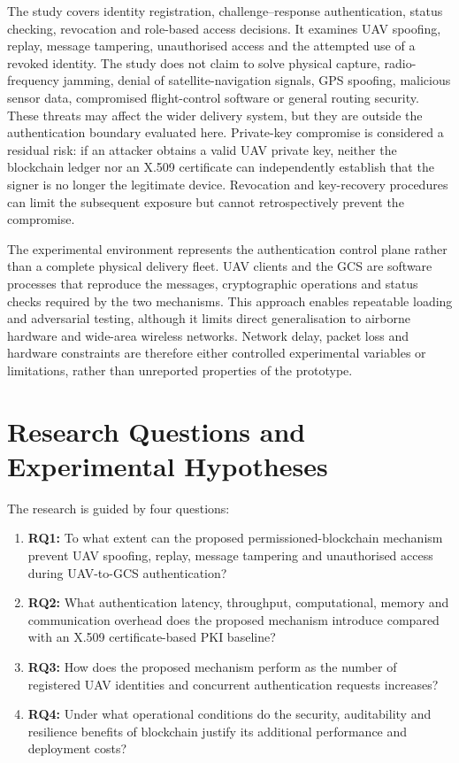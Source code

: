 The study covers identity registration, challenge--response authentication, status checking, revocation and role-based access decisions. It examines UAV spoofing, replay, message tampering, unauthorised access and the attempted use of a revoked identity. The study does not claim to solve physical capture, radio-frequency jamming, denial of satellite-navigation signals, GPS spoofing, malicious sensor data, compromised flight-control software or general routing security. These threats may affect the wider delivery system, but they are outside the authentication boundary evaluated here. Private-key compromise is considered a residual risk: if an attacker obtains a valid UAV private key, neither the blockchain ledger nor an X.509 certificate can independently establish that the signer is no longer the legitimate device. Revocation and key-recovery procedures can limit the subsequent exposure but cannot retrospectively prevent the compromise.

The experimental environment represents the authentication control plane rather than a complete physical delivery fleet. UAV clients and the GCS are software processes that reproduce the messages, cryptographic operations and status checks required by the two mechanisms. This approach enables repeatable loading and adversarial testing, although it limits direct generalisation to airborne hardware and wide-area wireless networks. Network delay, packet loss and hardware constraints are therefore either controlled experimental variables or limitations, rather than unreported properties of the prototype.

\section{Research Questions and Experimental Hypotheses}
\label{sec:questions-hypotheses}

The research is guided by four questions:

\begin{enumerate}
    \item \textbf{RQ1:} To what extent can the proposed permissioned-blockchain mechanism prevent UAV spoofing, replay, message tampering and unauthorised access during UAV-to-GCS authentication?
    \item \textbf{RQ2:} What authentication latency, throughput, computational, memory and communication overhead does the proposed mechanism introduce compared with an X.509 certificate-based PKI baseline?
    \item \textbf{RQ3:} How does the proposed mechanism perform as the number of registered UAV identities and concurrent authentication requests increases?
    \item \textbf{RQ4:} Under what operational conditions do the security, auditability and resilience benefits of blockchain justify its additional performance and deployment costs?
\end{enumerate}

